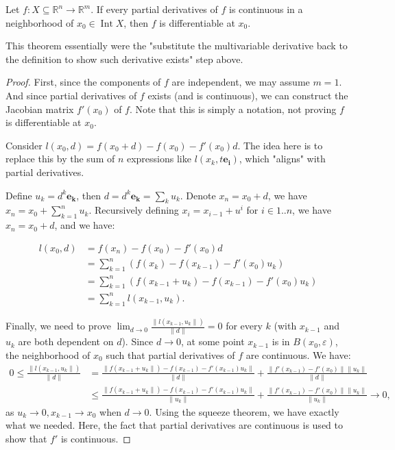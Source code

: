 \begin{theorem}
\label{thr:Continuous partials implies differentiability}
  Let \( f: X \subseteq \mathbb{R}^{n} \to  \mathbb{R}^{m} \). If every partial
  derivatives
  of \( f \) is continuous in a neighborhood of \( x_{0} \in \operatorname{Int}
  X\), then \( f \) is
  differentiable at \( x_{0} \).
\end{theorem}

This theorem essentially were the "substitute the multivariable derivative back
to the definition to show such derivative exists" step above.

\begin{proof}
  First, since the components of \( f \) are independent, we may assume \( m = 1
  \). And since partial derivatives of \( f \) exists (and is continuous), we
  can construct the Jacobian matrix \( f'(x_{0}) \) of \( f \). Note that this
  is simply a notation, not proving \( f \) is differentiable at \( x_{0} \).

  Consider \( l(x_{0}, d) = f(x_{0} + d) - f(x_{0}) - f'(x_{0})d \). The idea
  here is to replace this by the sum of \( n \) expressions like \( l(x_{k},
  t\mathbf{e_{i}}) \), which "aligns" with partial derivatives.

  Define \( u_{k} = d^{k}\mathbf{e_{k}} \), then \( d = d^{k}\mathbf{e_{k}} =
  \sum_{k} u_{k} \). Denote \( x_{n} = x_{0} + d \), we have \( x_{n} = x_{0} +
  \sum_{k=1}^{n} u_{k}\). Recursively defining \( x_{i} = x_{i - 1} + u^{i} \)
  for \( i \in 1..n \), we have \( x_{n} = x_{0} + d \), and we have:

  \begin{align*}
    l(x_{0}, d) &= f(x_{n}) - f(x_{0}) - f'(x_{0})d \\
    &= \sum_{k = 1}^{n} (f(x_{k}) - f(x_{k-1}) - f'(x_{0})u_{k}) \\
    &= \sum_{k = 1}^{n} (f(x_{k-1} + u_{k}) - f(x_{k-1}) - f'(x_{0})u_{k}) \\
    &= \sum_{k = 1}^{n} l(x_{k-1}, u_{k})
  .\end{align*}

  Finally, we need to prove \( \lim_{d \to 0} \frac{\|l(x_{k-1},
  u_{k}\|)}{\|d\|} = 0  \) for every \( k \) (with \( x_{k-1} \) and \( u_{k} \)
  are both dependent on \( d \)). Since \( d \to 0 \), at some point \( x_{k-1}
  \) is in \( B(x_{0}, \varepsilon) \), the neighborhood of \( x_{0} \) such
  that partial derivatives of \( f \) are continuous. We have:
  \begin{align*}
    0 \le \frac{\|l(x_{k-1}, u_{k}\|)}{\|d\|} &= \frac{\|f(x_{k-1}+u_{k}\|)-f(x_{k-1})
    -f'(x_{k-1})u_{k}\|}{\|d\|} + \frac{\|f'(x_{k-1}) - f'(x_{0})\|
  \|u_{k}\|}{\|d\|} \\
&\le \frac{\|f(x_{k-1}+u_{k}\|)-f(x_{k-1})
    -f'(x_{k-1})u_{k}\|}{\|u_{k}\|} + \frac{\|f'(x_{k-1}) - f'(x_{0})\|
  \|u_{k}\|}{\|u_{k}\|} \to 0
,\end{align*} as \( u_{k} \to 0, x_{k-1} \to x_{0} \) when \( d \to 0 \). Using
the squeeze theorem, we have exactly what we needed. Here, the fact that partial
derivatives are continuous is used to show that \( f' \) is continuous.
\end{proof}

